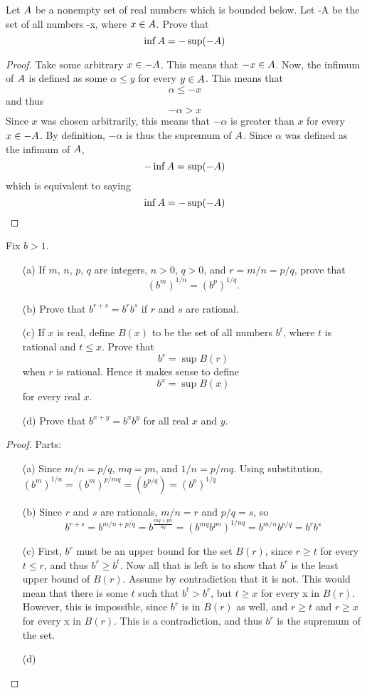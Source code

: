\documentclass[a4paper]{article}
\begin{document}
\begin{ex}[5]
Let $\mathnormal{A}$ be a nonempty set of real numbers which is bounded below. Let -A be the set of all numbers -x, where $x \in \mathnormal{A}$. Prove that $$\inf \mathnormal{A} = -\sup(-\mathnormal{A})$$
\begin{proof}
Take some arbitrary $x \in -\mathnormal{A}$. This means that $-x \in \mathnormal{A}$. Now, the infimum of $\mathnormal{A}$ is defined as some $\alpha \leq y$ for every $y \in \mathnormal{A}$. This means that $$\alpha \leq -x$$ and thus $$-\alpha > x$$ Since $x$ was chosen arbitrarily, this means that $-\alpha$ is greater than $x$ for every $x \in -\mathnormal{A}$. By definition, $-\alpha$ is thus the supremum of $\mathnormal{A}$. Since $\alpha$ was defined as the infimum of $\mathnormal{A}$, $$- \inf\mathnormal{A} = \sup(-\mathnormal{A})$$ which is equivalent to saying $$\inf \mathnormal{A} = -\sup(-\mathnormal{A})$$
\end{proof}
\end{ex}

\begin{ex}[6]
Fix $b > 1$.
    \begin{enumerate}
        \item[(a)] If $m$, $n$, $p$, $q$ are integers, $n>0$, $q>0$, and $r=m/n=p/q$, prove that $$(b^m)^{1/n}=(b^p)^{1/q}.$$
        \item[(b)] Prove that $b^{r+s}=b^rb^s$ if $r$ and $s$ are rational.
        \item[(c)] If $x$ is real, define $B(x)$ to be the set of all numbers $b^t$, where $t$ is rational and $t\le x$. Prove that $$b^r=\sup B(r)$$ when $r$ is rational.
Hence it makes sense to define $$b^x=\sup B(x)$$ for every real $x$.
        \item[(d)] Prove that $b^{x+y}=b^xb^y$ for all real $x$ and $y$.
    \end{enumerate}
    \begin{proof} Parts:
    \begin{enumerate}
        \item[(a)] Since $m/n = p/q$, $mq = pn$, and $1/n = p/mq$. Using substitution, $(b^m)^{1/n} = (b^m)^{p/mq} = (b^{p/q}) = (b^p)^{1/q}$
        \item[(b)] Since $r$ and $s$ are rationals, $m/n = r$ and $p/q = s$, so $$b^{r + s} = b^{m/n + p/q} = b^{\frac{mq + pn}{nq}} = (b^{mq}b^{pn})^{1/nq} = b^{m/n}b^{p/q} = b^rb^s$$
        \item[(c)] First, $b^r$ must be an upper bound for the set $B(r)$, since $r \geq t$ for every $t \leq r$, and thus $b^r \geq b^t$. Now all that is left is to show that $b^r$ is the least upper bound of $B(r)$. Assume by contradiction that it is not. This would mean that there is some $t$ such that $b^t > b^r$, but $t \geq x$ for every x in $B(r)$. However, this is impossible, since $b^r$ is in $B(r)$ as well, and $r \geq t$ and $r \geq x$ for every x in $B(r)$. This is a contradiction, and thus $b^r$ is the supremum of the set.
        \item[(d)]
    \end{enumerate}
    \end{proof}
\end{ex}
\end{document}
